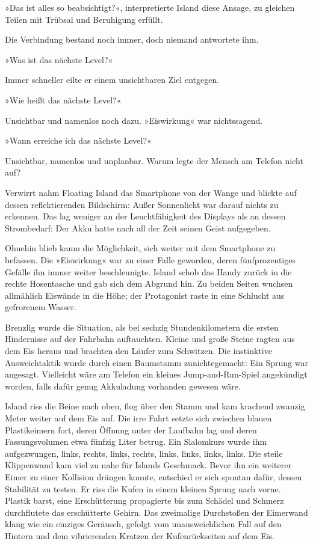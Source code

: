 
»Das ist alles so beabsichtigt?«, interpretierte Island diese Ansage, zu gleichen Teilen mit Trübsal und Beruhigung erfüllt.

Die Verbindung bestand noch immer, doch niemand antwortete ihm.

»Was ist das nächste Level?«

Immer schneller eilte er einem unsichtbaren Ziel entgegen.

»Wie heißt das nächste Level?«

Unsichtbar und namenlos noch dazu. »Eiswirkung« war nichtssagend.

»Wann erreiche ich das nächste Level?«

Unsichtbar, namenlos und unplanbar. Warum legte der Mensch am Telefon nicht auf?

Verwirrt nahm Floating Island das Smartphone von der Wange und blickte auf dessen reflektierenden Bildschirm: Außer Sonnenlicht war darauf nichts zu erkennen. Das lag weniger an der Leuchtfähigkeit des Displays als an dessen Strombedarf: Der Akku hatte nach all der Zeit seinen Geist aufgegeben.

Ohnehin blieb kaum die Möglichkeit, sich weiter mit dem Smartphone zu befassen. Die »Eiswirkung« war zu einer Falle geworden, deren fünfprozentiges Gefälle ihn immer weiter beschleunigte. Island schob das Handy zurück in die rechte Hosentasche und gab sich dem Abgrund hin. Zu beiden Seiten wuchsen allmählich Eiswände in die Höhe; der Protagonist raste in eine Schlucht aus gefrorenem Wasser.

Brenzlig wurde die Situation, als bei sechzig Stundenkilometern die ersten Hindernisse auf der Fahrbahn auftauchten. Kleine und große Steine ragten aus dem Eis heraus und brachten den Läufer zum Schwitzen. Die instinktive Ausweichtaktik wurde durch einen Baumstamm zunichtegemacht: Ein Sprung war angesagt. Vielleicht wäre am Telefon ein kleines Jump-and-Run-Spiel angekündigt worden, falls dafür genug Akkuladung vorhanden gewesen wäre.

Island riss die Beine nach oben, flog über den Stamm und kam krachend zwanzig Meter weiter auf dem Eis auf. Die irre Fahrt setzte sich zwischen blauen Plastikeimern fort, deren Öffnung unter der Laufbahn lag und deren Fassungsvolumen etwa fünfzig Liter betrug. Ein Slalomkurs wurde ihm aufgezwungen, links, rechts, links, rechts, links, links, links, links. Die steile Klippenwand kam viel zu nahe für Islands Geschmack. Bevor ihn ein weiterer Eimer zu einer Kollision drängen konnte, entschied er sich spontan dafür, dessen Stabilität zu testen. Er riss die Kufen in einem kleinen Sprung nach vorne. Plastik barst, eine Erschütterung propagierte bis zum Schädel und Schmerz durchflutete das erschütterte Gehirn. Das zweimalige Durchstoßen der Eimerwand klang wie ein einziges Geräusch, gefolgt vom unausweichlichen Fall auf den Hintern und dem vibrierenden Kratzen der Kufenrückseiten auf dem Eis.


